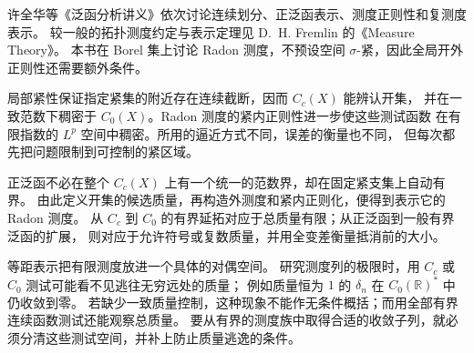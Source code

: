 \ProseParagraphBreak

许全华等《泛函分析讲义》\cite[第10章]{Xu2017Fanhan}依次讨论连续划分、正泛函表示、测度正则性和复测度表示。
较一般的拓扑测度约定与表示定理见 D.~H. Fremlin 的《Measure Theory》\cite[Volume 4, \S\S411, 416, and 436--437; Appendix, \S4A2]{Fremlin2016Measure}。
本书在 Borel 集上讨论 Radon 测度，不预设空间 \(\sigma\)-紧，因此全局开外正则性还需要额外条件。





\begin{chaptersummary}
局部紧性保证指定紧集的附近存在连续截断，因而 \(C_c(X)\) 能辨认开集，
并在一致范数下稠密于 \(C_0(X)\)。Radon 测度的紧内正则性进一步使这些测试函数
在有限指数的 \(L^p\) 空间中稠密。所用的逼近方式不同，误差的衡量也不同，
但每次都先把问题限制到可控制的紧区域。

\ProseParagraphBreak

正泛函不必在整个 \(C_c(X)\) 上有一个统一的范数界，却在固定紧支集上自动有界。
由此定义开集的候选质量，再构造外测度和紧内正则化，便得到表示它的 Radon 测度。
从 \(C_c\) 到 \(C_0\) 的有界延拓对应于总质量有限；从正泛函到一般有界泛函的扩展，
则对应于允许符号或复数质量，并用全变差衡量抵消前的大小。

\ProseParagraphBreak

等距表示把有限测度放进一个具体的对偶空间。
研究测度列的极限时，用 \(C_c\) 或 \(C_0\) 测试可能看不见逃往无穷远处的质量；
例如质量恒为 \(1\) 的 \(\delta_n\) 在 \(C_0(\mathbb R)^*\) 中仍\WeakStar{}收敛到零。
若缺少一致质量控制，这种现象不能作无条件概括；而用全部有界连续函数测试还能观察总质量。
要从有界的测度族中取得合适的收敛子列，就必须分清这些测试空间，并补上防止质量逃逸的条件。
\end{chaptersummary}


\BookExercises


